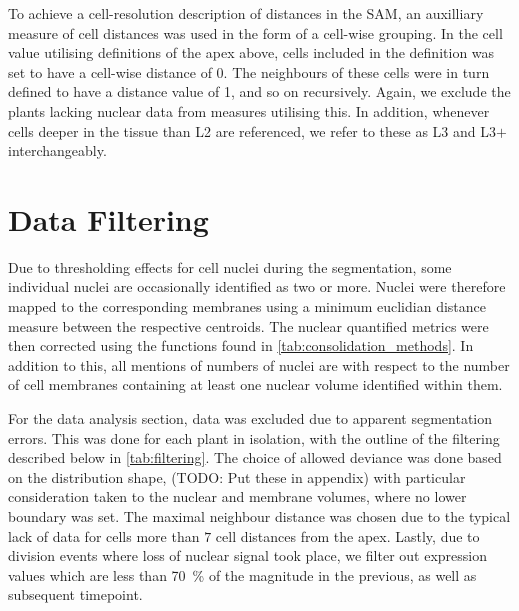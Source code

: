 To achieve a cell-resolution description of distances in the SAM,
an auxilliary measure of cell distances was used in the form of a cell-wise
grouping. In the cell value utilising definitions of the apex above, cells
included in the definition was set to have a cell-wise distance of 0. The
neighbours of these cells were in turn defined to have a distance value of 1,
and so on recursively. Again, we exclude the plants lacking nuclear data from
measures utilising this. In addition, whenever cells deeper in the tissue than L2 are
referenced, we refer to these as L3 and L3$+$ interchangeably.

\section[Data Filtering]{Data Filtering}
\label{sec:filtering}
Due to thresholding effects for cell nuclei during the segmentation, some
individual nuclei are occasionally identified as two or more. Nuclei were
therefore mapped to the corresponding membranes using a minimum euclidian distance
measure between the respective centroids. The nuclear quantified metrics were
then corrected using the functions found in \cref{tab:consolidation_methods}. In
addition to this, all mentions of numbers of nuclei are with respect to the
number of cell membranes containing at least one nuclear volume identified
within them.

For the data analysis section, data was excluded due to apparent segmentation
errors. This was done for each plant in isolation, with the outline of the
filtering described below in \cref{tab:filtering}. The choice of allowed
deviance was done based on the distribution shape, (TODO: Put these in appendix)
with particular consideration 
taken to the nuclear and membrane volumes, where no lower boundary was set. The
maximal neighbour distance was chosen due to the typical lack of data for cells more
than $7$ cell distances from the apex. Lastly, due to division events where
loss of nuclear signal took place, we filter out expression values which are
less than 70~\% of the magnitude in the previous, as well as subsequent timepoint.

